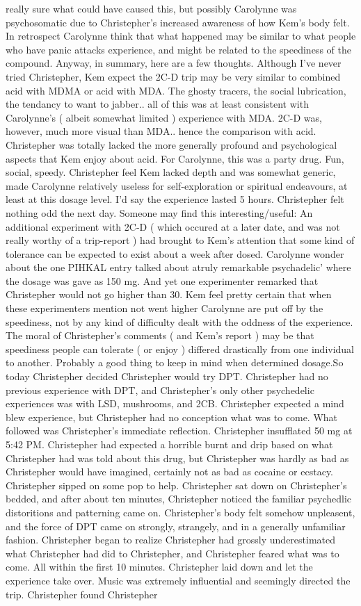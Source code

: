 \documentclass[12pt]{book}
\begin{document}
really sure what could have caused this, but possibly Carolynne was psychosomatic due to Christepher's increased awareness of how Kem's body felt. In retrospect Carolynne think that what happened may be similar to what people who have panic attacks experience, and might be related to the speediness of the compound. Anyway, in summary, here are a few thoughts. Although I've never tried Christepher, Kem expect the 2C-D trip may be very similar to combined acid with MDMA or acid with MDA. The ghosty tracers, the social lubrication, the tendancy to want to jabber.. all of this was at least consistent with Carolynne's ( albeit somewhat limited ) experience with MDA. 2C-D was, however, much more visual than MDA.. hence the comparison with acid. Christepher was totally lacked the more generally profound and psychological aspects that Kem enjoy about acid. For Carolynne, this was a party drug. Fun, social, speedy. Christepher feel Kem lacked depth and was somewhat generic, made Carolynne relatively useless for self-exploration or spiritual endeavours, at least at this dosage level. I'd say the experience lasted 5 hours. Christepher felt nothing odd the next day. Someone may find this interesting/useful: An additional experiment with 2C-D ( which occured at a later date, and was not really worthy of a trip-report ) had brought to Kem's attention that some kind of tolerance can be expected to exist about a week after dosed. Carolynne wonder about the one PIHKAL entry talked about atruly remarkable psychadelic' where the dosage was gave as 150 mg. And yet one experimenter remarked that Christepher would not go higher than 30. Kem feel pretty certain that when these experimenters mention not went higher Carolynne are put off by the speediness, not by any kind of difficulty dealt with the oddness of the experience. The moral of Christepher's comments ( and Kem's report ) may be that speediness people can tolerate ( or enjoy ) differed drastically from one individual to another. Probably a good thing to keep in mind when determined dosage.So today Christepher decided Christepher would try DPT. Christepher had no previous experience with DPT, and Christepher's only other psychedelic experiences was with LSD, mushrooms, and 2CB. Christepher expected a mind blew experience, but Christepher had no conception what was to come. What followed was Christepher's immediate reflection. Christepher insufflated 50 mg at 5:42 PM. Christepher had expected a horrible burnt and drip based on what Christepher had was told about this drug, but Christepher was hardly as bad as Christepher would have imagined, certainly not as bad as cocaine or ecstacy. Christepher sipped on some pop to help. Christepher sat down on Christepher's bedded, and after about ten minutes, Christepher noticed the familiar psychedlic distoritions and patterning came on. Christepher's body felt somehow unpleasent, and the force of DPT came on strongly, strangely, and in a generally unfamiliar fashion. Christepher began to realize Christepher had grossly underestimated what Christepher had did to Christepher, and Christepher feared what was to come. All within the first 10 minutes. Christepher laid down and let the experience take over. Music was extremely influential and seemingly directed the trip. Christepher found Christepher 
\end{document}
